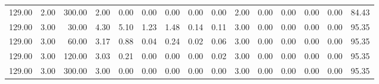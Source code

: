 \begin{table}[ht]
\begin{tabular}{rrrrrrrrrrrrrrr}
  129.00 & 2.00 & 300.00 & 2.00 & 0.00 & 0.00 & 0.00 & 0.00 & 0.00 & 2.00 & 0.00 & 0.00 & 0.00 & 0.00 & 84.43 \\ 
  129.00 & 3.00 & 30.00 & 4.30 & 5.10 & 1.23 & 1.48 & 0.14 & 0.11 & 3.00 & 0.00 & 0.00 & 0.00 & 0.00 & 95.35 \\ 
  129.00 & 3.00 & 60.00 & 3.17 & 0.88 & 0.04 & 0.24 & 0.02 & 0.06 & 3.00 & 0.00 & 0.00 & 0.00 & 0.00 & 95.35 \\ 
  129.00 & 3.00 & 120.00 & 3.03 & 0.21 & 0.00 & 0.00 & 0.00 & 0.02 & 3.00 & 0.00 & 0.00 & 0.00 & 0.00 & 95.35 \\ 
  129.00 & 3.00 & 300.00 & 3.00 & 0.00 & 0.00 & 0.00 & 0.00 & 0.00 & 3.00 & 0.00 & 0.00 & 0.00 & 0.00 & 95.35 \\ 
   \hline
\end{tabular}
\end{table}
